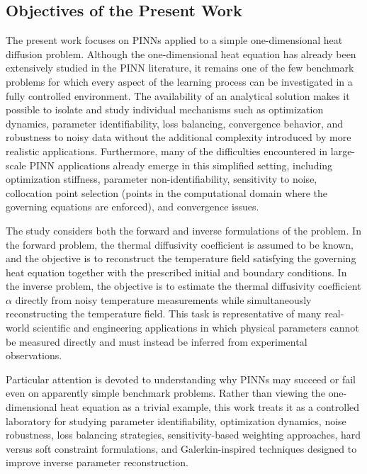 \subsection{Objectives of the Present Work}

The present work focuses on PINNs applied to a simple one-dimensional heat diffusion problem. Although the one-dimensional heat equation has already been extensively studied in the PINN literature, it remains one of the few benchmark problems for which every aspect of the learning process can be investigated in a fully controlled environment. The availability of an analytical solution makes it possible to isolate and study individual mechanisms such as optimization dynamics, parameter identifiability, loss balancing, convergence behavior, and robustness to noisy data without the additional complexity introduced by more realistic applications. Furthermore, many of the difficulties encountered in large-scale PINN applications already emerge in this simplified setting, including optimization stiffness, parameter non-identifiability, sensitivity to noise, collocation point selection (points in the computational domain where the governing equations are enforced), and convergence issues.

The study considers both the forward and inverse formulations of the problem. In the forward problem, the thermal diffusivity coefficient is assumed to be known, and the objective is to reconstruct the temperature field satisfying the governing heat equation together with the prescribed initial and boundary conditions. In the inverse problem, the objective is to estimate the thermal diffusivity coefficient $\alpha$ directly from noisy temperature measurements while simultaneously reconstructing the temperature field. This task is representative of many real-world scientific and engineering applications in which physical parameters cannot be measured directly and must instead be inferred from experimental observations.

Particular attention is devoted to understanding why PINNs may succeed or fail even on apparently simple benchmark problems. Rather than viewing the one-dimensional heat equation as a trivial example, this work treats it as a controlled laboratory for studying parameter identifiability, optimization dynamics, noise robustness, loss balancing strategies, sensitivity-based weighting approaches, hard versus soft constraint formulations, and Galerkin-inspired techniques designed to improve inverse parameter reconstruction.

